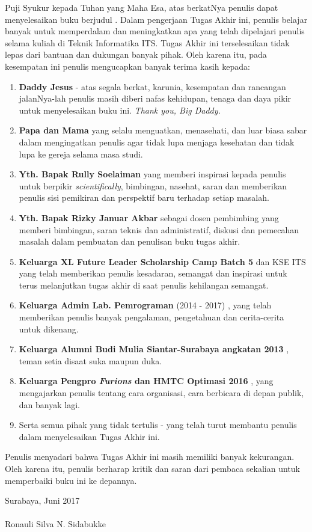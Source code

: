   Puji Syukur kepada Tuhan yang Maha Esa, atas berkatNya penulis dapat menyelesaikan buku berjudul \textbf{\judul}. Dalam pengerjaan Tugas Akhir ini, penulis belajar banyak untuk memperdalam dan meningkatkan apa yang telah dipelajari penulis selama kuliah di Teknik Informatika ITS.
  Tugas Akhir ini terselesaikan tidak lepas dari bantuan dan dukungan banyak pihak. Oleh karena itu, pada kesempatan ini penulis mengucapkan banyak terima kasih kepada:
  \begin{enumerate}
  	\item \textbf{Daddy Jesus} - atas segala berkat, karunia, kesempatan dan rancangan jalanNya-lah penulis masih diberi nafas kehidupan, tenaga dan daya pikir untuk menyelesaikan buku ini. \textit{Thank you, Big Daddy.}
    \item \textbf{Papa dan Mama} yang selalu menguatkan, menasehati, dan luar biasa sabar dalam mengingatkan penulis agar tidak lupa menjaga kesehatan dan tidak lupa ke gereja selama masa studi.
    \item \textbf{Yth. Bapak Rully Soelaiman} yang memberi inspirasi kepada penulis untuk berpikir \textit{scientifically}, bimbingan, nasehat, saran dan memberikan penulis sisi pemikiran dan perspektif baru terhadap setiap masalah.
    \item \textbf{Yth. Bapak Rizky Januar Akbar} sebagai dosen pembimbing yang memberi bimbingan, saran teknis dan administratif, diskusi dan pemecahan masalah dalam pembuatan dan penulisan buku tugas akhir.
    \item \textbf{Keluarga XL Future Leader Scholarship Camp Batch 5} dan KSE ITS yang telah memberikan penulis kesadaran, semangat dan inspirasi untuk terus melanjutkan tugas akhir di saat penulis kehilangan semangat.
    \item \textbf{Keluarga Admin Lab. Pemrograman }(2014 - 2017) , yang telah memberikan penulis banyak pengalaman, pengetahuan dan cerita-cerita untuk dikenang.
    \item \textbf{Keluarga Alumni Budi Mulia Siantar-Surabaya angkatan 2013 } , teman setia disaat suka maupun duka.
    \item  \textbf{Keluarga Pengpro \textit{Furions} dan HMTC Optimasi 2016 }, yang mengajarkan penulis tentang cara organisasi, cara berbicara di depan publik, dan banyak lagi.    
    \item Serta semua pihak yang tidak tertulis - yang telah turut membantu penulis dalam menyelesaikan Tugas Akhir ini.
  \end{enumerate}
  Penulis menyadari bahwa Tugas Akhir ini masih memiliki banyak kekurangan. Oleh karena itu, penulis berharap kritik dan saran dari pembaca sekalian untuk memperbaiki buku ini ke depannya.


  \hfill Surabaya, Juni 2017 \\ \\ 


  \hfill Ronauli Silva N. Sidabukke

\cleardoublepage %

